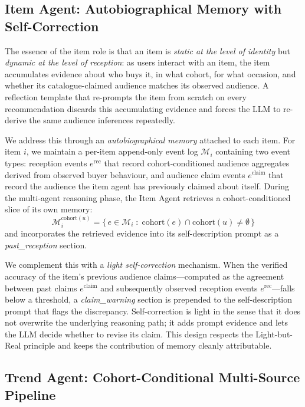 \documentclass[master,english,final]{postech-ucs}
\begin{document}
\subsection{Item Agent: Autobiographical Memory with Self-Correction}

The essence of the item role is that an item is \emph{static at the level of identity} but \emph{dynamic at the level of reception}: as users interact with an item, the item accumulates evidence about who buys it, in what cohort, for what occasion, and whether its catalogue-claimed audience matches its observed audience.
A reflection template that re-prompts the item from scratch on every recommendation discards this accumulating evidence and forces the LLM to re-derive the same audience inferences repeatedly.

We address this through an \emph{autobiographical memory} attached to each item.
For item $i$, we maintain a per-item append-only event log $\mathcal{M}_i$ containing two event types: reception events $e^{\text{rec}}$ that record cohort-conditioned audience aggregates derived from observed buyer behaviour, and audience claim events $e^{\text{claim}}$ that record the audience the item agent has previously claimed about itself.
During the multi-agent reasoning phase, the Item Agent retrieves a cohort-conditioned slice of its own memory:
\begin{equation}
    \mathcal{M}_i^{\text{cohort}(u)} = \bigl\{\, e \in \mathcal{M}_i \;:\; \text{cohort}(e) \cap \text{cohort}(u) \neq \emptyset \,\bigr\}
\end{equation}
and incorporates the retrieved evidence into its self-description prompt as a \emph{past\_reception} section.

We complement this with a \emph{light self-correction} mechanism.
When the verified accuracy of the item's previous audience claims---computed as the agreement between past claims $e^{\text{claim}}$ and subsequently observed reception events $e^{\text{rec}}$---falls below a threshold, a \emph{claim\_warning} section is prepended to the self-description prompt that flags the discrepancy.
Self-correction is light in the sense that it does not overwrite the underlying reasoning path; it adds prompt evidence and lets the LLM decide whether to revise its claim.
This design respects the Light-but-Real principle and keeps the contribution of memory cleanly attributable.


\subsection{Trend Agent: Cohort-Conditional Multi-Source Pipeline}
\end{document}
